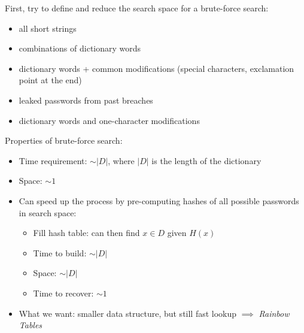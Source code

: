

First, try to define and reduce the search space for a brute-force search:
\begin{itemize}
    \item all short strings
    \item combinations of dictionary words
    \item dictionary words + common modifications (special characters, exclamation point at the end)
    \item leaked passwords from past breaches
    \item dictionary words and one-character modifications
\end{itemize}

Properties of brute-force search:
\begin{itemize}
    \item Time requirement: $\sim|D|$, where $|D|$ is the length of the dictionary
    \item Space: $\sim1$
    \item Can speed up the process by pre-computing hashes of all possible passwords in search space:
    	\begin{itemize}
		\item Fill hash table: can then find $x \in D$ given $H(x)$
		\item Time to build: $\sim|D|$
		\item Space: $\sim|D|$
		\item Time to recover: $\sim1$
	\end{itemize}
    \item What we want: smaller data structure, but still fast lookup $\implies$ \emph{Rainbow Tables}
\end{itemize}

